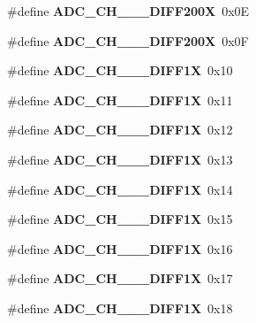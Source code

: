 \begin{CompactItemize}
\item 
\hypertarget{group__a2d_ga2678f0cab37f1a9c526679363460962}{
\#define \textbf{ADC\_\-CH\_\_\_\-DIFF200X}~0x0E}
\label{group__a2d_ga2678f0cab37f1a9c526679363460962}

\item 
\hypertarget{group__a2d_g8c54c7176365604c459ab8a06231d909}{
\#define \textbf{ADC\_\-CH\_\_\_\-DIFF200X}~0x0F}
\label{group__a2d_g8c54c7176365604c459ab8a06231d909}

\item 
\hypertarget{group__a2d_g1f7378bc96b9faff43a7b2c5639405c1}{
\#define \textbf{ADC\_\-CH\_\_\_\-DIFF1X}~0x10}
\label{group__a2d_g1f7378bc96b9faff43a7b2c5639405c1}

\item 
\hypertarget{group__a2d_gb08fb3b8335d0134639b7cd37def4b48}{
\#define \textbf{ADC\_\-CH\_\_\_\-DIFF1X}~0x11}
\label{group__a2d_gb08fb3b8335d0134639b7cd37def4b48}

\item 
\hypertarget{group__a2d_g9e466f0a78d4a76e060254fc2a9dae77}{
\#define \textbf{ADC\_\-CH\_\_\_\-DIFF1X}~0x12}
\label{group__a2d_g9e466f0a78d4a76e060254fc2a9dae77}

\item 
\hypertarget{group__a2d_g5ca820abd164971170288e59fa41e2d9}{
\#define \textbf{ADC\_\-CH\_\_\_\-DIFF1X}~0x13}
\label{group__a2d_g5ca820abd164971170288e59fa41e2d9}

\item 
\hypertarget{group__a2d_g9faea1861eb2bc2d916eb9fbfddeef38}{
\#define \textbf{ADC\_\-CH\_\_\_\-DIFF1X}~0x14}
\label{group__a2d_g9faea1861eb2bc2d916eb9fbfddeef38}

\item 
\hypertarget{group__a2d_g85a30293d96db3700b4b9be90c0fbb33}{
\#define \textbf{ADC\_\-CH\_\_\_\-DIFF1X}~0x15}
\label{group__a2d_g85a30293d96db3700b4b9be90c0fbb33}

\item 
\hypertarget{group__a2d_g4c657e2d57628fa1985d2ff38e165314}{
\#define \textbf{ADC\_\-CH\_\_\_\-DIFF1X}~0x16}
\label{group__a2d_g4c657e2d57628fa1985d2ff38e165314}

\item 
\hypertarget{group__a2d_g7f35bdea141f9aa32a07f4cb1d0ccd86}{
\#define \textbf{ADC\_\-CH\_\_\_\-DIFF1X}~0x17}
\label{group__a2d_g7f35bdea141f9aa32a07f4cb1d0ccd86}

\item 
\hypertarget{group__a2d_ga7bf0c13604c130feb76935e177124bb}{
\#define \textbf{ADC\_\-CH\_\_\_\-DIFF1X}~0x18}
\label{group__a2d_ga7bf0c13604c130feb76935e177124bb}


\end{CompactItemize}
